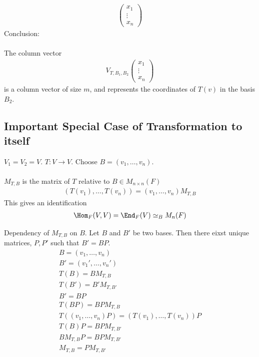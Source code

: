 \documentclass[class=scrartcl, crop=false]{standalone}
\begin{document}
\begin{enumerate}
\begin{gather*}
    \begin{pmatrix}
      x_1 \\
      \vdots \\
      x_n
    \end{pmatrix} 
  \end{gather*} 
  \ii
  Conclusion:
  \\\\
  The column vector
  \begin{gather*}
    V_{T, B_1, B_2}
    \begin{pmatrix}
      x_1 \\
      \vdots \\
      x_n
    \end{pmatrix} 
  \end{gather*} 
  is a column vector of size $m$, and represents the coordinates of $T(v)$ in the basis $B_2$.
\end{enumerate} 

\subsection{Important Special Case of Transformation to itself}

$V_1 = V_2 = V$. $T: V \to V$. Choose $B = (v_1, \dots, v_n)$.
\\\\
$M_{T, B}$ is the matrix of $T$ relative to $B \in M_{n \times n}(F)$
\begin{gather*}
  (T(v_1), \dots, T(v_n)) = (v_1, \dots, v_n) M_{T, B}
\end{gather*} 
This gives an identification
\begin{gather*}
  \Hom_F(V, V) = \End_F(V) \simeq_B M_n(F)
\end{gather*} 

Dependency of $M_{T, B}$ on $B$. Let $B$ and $B'$  be two bases. Then there eixst unique matrices, $P, P'$ such that $B' = BP$.
\begin{gather*}
  B = (v_1, \dots, v_n) \\
  B' = (v_1', \dots, v_n') \\
  T(B) = B M_{T, B} \\
  T(B') = B' M_{T, B'} \\
  B' = BP \\
  T(BP) = B P M_{T, B} \\
  T((v_1, \dots, v_n)P) = (T(v_1), \dots, T(v_n))P \\
  T(B) P = B P M_{T, B'} \\
  B M_{T, B} P = B P M_{T, B'} \\
  M_{T, B} = P M_{T, B'}
\end{gather*} 
\end{document}
